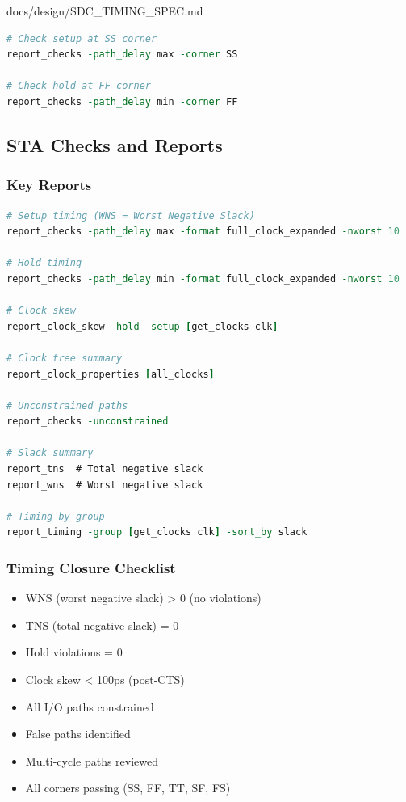 \begin{relocated}{docs/design/SDC_TIMING_SPEC.md}
\begin{lstlisting}[language=tcl]
# Check setup at SS corner
report_checks -path_delay max -corner SS

# Check hold at FF corner
report_checks -path_delay min -corner FF
\end{lstlisting}

\subsection{STA Checks and Reports}\label{ds:ch:sdc-timing-spec:sta-checks-and-reports}

\subsubsection{Key Reports}\label{ds:ch:sdc-timing-spec:key-reports}

\begin{lstlisting}[language=tcl]
# Setup timing (WNS = Worst Negative Slack)
report_checks -path_delay max -format full_clock_expanded -nworst 10

# Hold timing
report_checks -path_delay min -format full_clock_expanded -nworst 10

# Clock skew
report_clock_skew -hold -setup [get_clocks clk]

# Clock tree summary
report_clock_properties [all_clocks]

# Unconstrained paths
report_checks -unconstrained

# Slack summary
report_tns  # Total negative slack
report_wns  # Worst negative slack

# Timing by group
report_timing -group [get_clocks clk] -sort_by slack
\end{lstlisting}

\subsubsection{Timing Closure Checklist}\label{ds:ch:sdc-timing-spec:timing-closure-checklist}

\begin{itemize}
\tightlist
\item[$\square$]
  WNS (worst negative slack) \textgreater{} 0 (no violations)
\item[$\square$]
  TNS (total negative slack) = 0
\item[$\square$]
  Hold violations = 0
\item[$\square$]
  Clock skew \textless{} 100ps (post-CTS)
\item[$\square$]
  All I/O paths constrained
\item[$\square$]
  False paths identified
\item[$\square$]
  Multi-cycle paths reviewed
\item[$\square$]
  All corners passing (SS, FF, TT, SF, FS)
\end{itemize}


\end{relocated}
